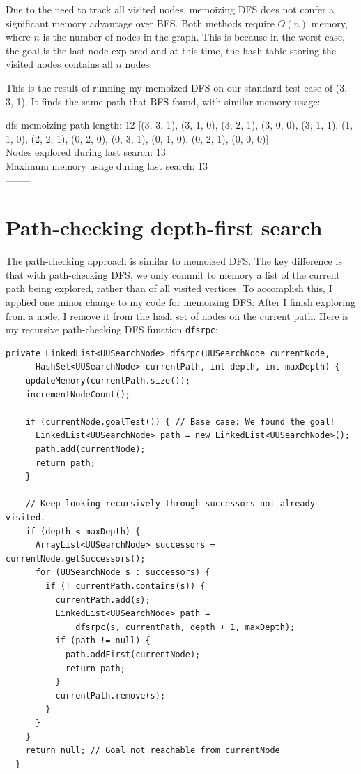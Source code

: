 \documentclass{article}
\begin{document}
Due to the need to track all visited nodes, memoizing DFS does not confer a significant memory advantage over BFS. Both methods require $O(n)$ memory, where $n$ is the number of nodes in the graph. This is because in the worst case, the goal is the last node explored and at this time, the hash table storing the visited nodes contains all $n$ nodes.

This is the result of running my memoized DFS on our standard test case of (3, 3, 1). It finds the same path that BFS found, with similar memory usage:

\vspace{5mm}

{\setlength{\parindent}{0cm}
dfs memoizing path length: 12 [(3, 3, 1), (3, 1, 0), (3, 2, 1), (3, 0, 0), (3, 1, 1), (1, 1, 0), (2, 2, 1), (0, 2, 0), (0, 3, 1), (0, 1, 0), (0, 2, 1), (0, 0, 0)]\\
Nodes explored during last search: 13\\
Maximum memory usage during last search: 13\\
--------}

\section{Path-checking depth-first search}

The path-checking approach is similar to memoized DFS. The key difference is that with path-checking DFS, we only commit to memory a list of the current path being explored, rather than of all visited vertices. To accomplish this, I applied one minor change to my code for memoizing DFS: After I finish exploring from a node, I remove it from the hash set of nodes on the current path. Here is my recursive path-checking DFS function \verb`dfsrpc`:

\begin{lstlisting}
private LinkedList<UUSearchNode> dfsrpc(UUSearchNode currentNode, 
      HashSet<UUSearchNode> currentPath, int depth, int maxDepth) {
    updateMemory(currentPath.size());
    incrementNodeCount();
  
    if (currentNode.goalTest()) { // Base case: We found the goal!
      LinkedList<UUSearchNode> path = new LinkedList<UUSearchNode>();
      path.add(currentNode);
      return path;
    }
    
    // Keep looking recursively through successors not already visited.
    if (depth < maxDepth) {
      ArrayList<UUSearchNode> successors = currentNode.getSuccessors();
      for (UUSearchNode s : successors) {
        if (! currentPath.contains(s)) {
          currentPath.add(s);
          LinkedList<UUSearchNode> path = 
              dfsrpc(s, currentPath, depth + 1, maxDepth);
          if (path != null) {
            path.addFirst(currentNode);
            return path;
          }
          currentPath.remove(s);
        }
      }
    }
    return null; // Goal not reachable from currentNode
  }
\end{lstlisting}
\end{document}
